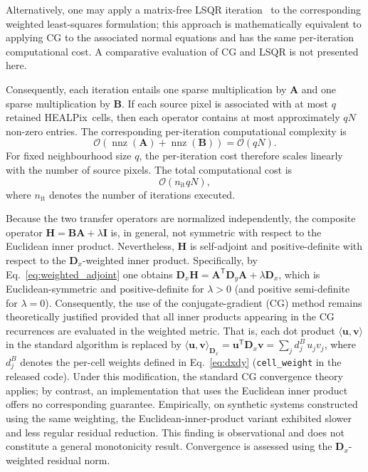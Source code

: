 \documentclass[journal]{IEEEtran}
\newcommand{\healpix}{HEALPix\xspace}
\begin{document}
Alternatively, one may apply a matrix-free LSQR iteration~\cite{paige1982lsqr} to the corresponding weighted least-squares formulation; this approach is mathematically equivalent to applying CG to the associated normal equations and has the same per-iteration computational cost. A comparative evaluation of CG and LSQR is not presented here.

Consequently, each iteration entails one sparse multiplication by $\mathbf{A}$ and one sparse multiplication by $\mathbf{B}$. If each source pixel is associated with at most $q$ retained \healpix\ cells, then each operator contains at most approximately $qN$ non-zero entries. The corresponding per-iteration computational complexity is
\begin{equation}
\mathcal{O}
\left(
\operatorname{nnz}(\mathbf{A})
+
\operatorname{nnz}(\mathbf{B})
\right)
=
\mathcal{O}(qN).
\end{equation}
For fixed neighbourhood size $q$, the per-iteration cost therefore scales linearly with the number of source pixels. The total computational cost is
\begin{equation}
\mathcal{O}(n_{\mathrm{it}}qN),
\end{equation}
where $n_{\mathrm{it}}$ denotes the number of iterations executed.

Because the two transfer operators are normalized independently, the composite operator $\mathbf H=\mathbf B\mathbf A+\lambda\mathbf I$ is, in general, not symmetric with respect to the Euclidean inner product. Nevertheless, $\mathbf H$ is self-adjoint and positive-definite with respect to the $\mathbf D_x$-weighted inner product. Specifically, by Eq.~\eqref{eq:weighted_adjoint} one obtains
$\mathbf D_x\mathbf H=\mathbf A^{\mathsf T}\mathbf D_y\mathbf A+\lambda\mathbf D_x$,
which is Euclidean-symmetric and positive-definite for $\lambda>0$ (and positive semi-definite for $\lambda=0$). Consequently, the use of the conjugate-gradient (CG) method remains theoretically justified provided that all inner products appearing in the CG recurrences are evaluated in the weighted metric. That is, each dot product $\langle\mathbf u,\mathbf v\rangle$ in the standard algorithm is replaced by
$\langle\mathbf u,\mathbf v\rangle_{\mathbf D_x}=\mathbf u^{\mathsf T}\mathbf D_x\mathbf v=\sum_j d^{B}_j\,u_jv_j$,
where $d^{B}_j$ denotes the per-cell weights defined in Eq.~\eqref{eq:dxdy} (\texttt{cell\_weight} in the released code). Under this modification, the standard CG convergence theory applies; by contrast, an implementation that uses the Euclidean inner product offers no corresponding guarantee. Empirically, on synthetic systems constructed using the same weighting, the Euclidean-inner-product variant exhibited slower and less regular residual reduction. This finding is observational and does not constitute a general monotonicity result. Convergence is assessed using the $\mathbf D_x$-weighted residual norm.
\end{document}
